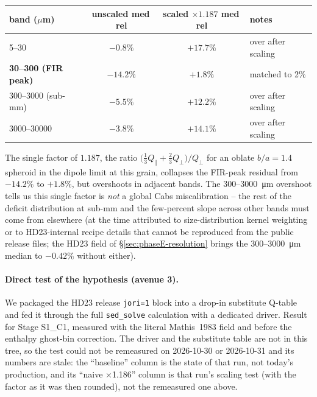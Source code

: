 \documentclass{my_memo}
\let\mathbf\boldsymbol
\begin{document}
\begin{tabularx}{0.95\textwidth}{l c c X}
\toprule
band ($\mu$m)            & unscaled med\,rel & scaled $\times 1.187$ med\,rel & notes \\
\midrule
5--30                    & $-0.8\%$  & $+17.7\%$ & over after scaling \\
\bfseries 30--300 (FIR peak)  & $\mathbf{-14.2\%}$ & $\mathbf{+1.8\%}$  & matched to 2\% \\
300--3000 (sub-mm)       & $-5.5\%$  & $+12.2\%$ & over after scaling \\
3000--30000              & $-3.8\%$  & $+14.1\%$ & over after scaling \\
\bottomrule
\end{tabularx}

The single factor of $1.187$, the ratio
$\bigl(\tfrac{1}{3} Q_\parallel + \tfrac{2}{3}Q_\perp\bigr) / Q_\perp$
for an oblate $b/a = 1.4$ spheroid in the dipole limit at this grain,
collapses the FIR-peak residual from $-14.2\%$ to $+1.8\%$, but
overshoots in adjacent bands. The 300--\SI{3000}{\micro\meter}
overshoot tells us this single factor is \emph{not} a global Cabs
miscalibration -- the rest of the deficit distribution at sub-mm and
the few-percent slope across other bands must come from elsewhere
(at the time attributed to size-distribution kernel weighting or to
HD23-internal recipe details that cannot be reproduced from the public
release files; the HD23 field of \S\ref{sec:phaseE-resolution} brings
the 300--\SI{3000}{\micro\meter} median to $-0.42\%$ without either).

\paragraph{Direct test of the hypothesis (avenue 3).}
We packaged the HD23 release \texttt{jori=1} block into a drop-in
substitute Q-table and fed it through the full \texttt{sed\_solve}
calculation with a dedicated driver. Result for Stage S1\_C1, measured
with the literal Mathis~1983 field and before the enthalpy ghost-bin
correction. The driver and the substitute table are not in this tree,
so the test could not be remeasured on 2026-10-30 or 2026-10-31 and its
numbers are stale: the ``baseline'' column is the state of that run,
not today's production, and its ``naive $\times$1.186'' column is that
run's scaling test (with the factor as it was then rounded), not the
remeasured one above.
\end{document}
